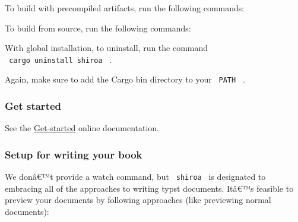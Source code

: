 To build with precompiled artifacts, run the following commands:

\begin{Shaded}
\begin{Highlighting}[]
\end{Highlighting}
\end{Shaded}

To build from source, run the following commands:

\begin{Shaded}
\begin{Highlighting}[]
 
\end{Highlighting}
\end{Shaded}

With global installation, to uninstall, run the command
\texttt{\ cargo\ uninstall\ shiroa\ } .

Again, make sure to add the Cargo bin directory to your
\texttt{\ PATH\ } .

\subsubsection{Get started}\label{get-started}

See the
\href{https://myriad-dreamin.github.io/shiroa/guide/get-started.html}{Get-started}
online documentation.

\subsubsection{Setup for writing your
book}\label{setup-for-writing-your-book}

We donâ€™t provide a watch command, but \texttt{\ shiroa\ } is
designated to embracing all of the approaches to writing typst
documents. Itâ€™s feasible to preview your documents by following
approaches (like previewing normal documents):

